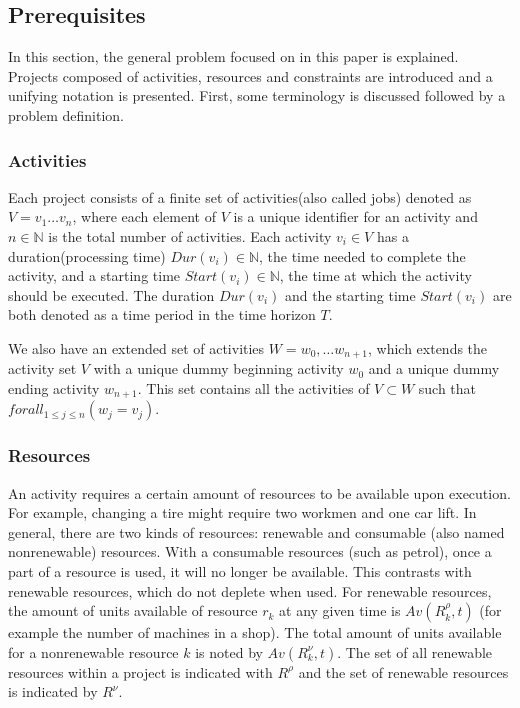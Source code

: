\documentclass{article}
\newcommand{\renres}[0]{R^\rho} %
\newcommand{\conres}[0]{R^\nu} %
\newcommand{\av}[1]{\textit{Av}(#1)} %
\newcommand{\dur}[1]{\textit{Dur}(#1)} %
\newcommand{\start}[1]{\textit{Start}(#1)} %
\begin{document}
\subsection{Prerequisites}
In this section, the general problem focused on in this paper is explained.
Projects composed of activities, resources and constraints are introduced and a unifying notation is presented.
First, some terminology is discussed followed by a problem definition.

\subsubsection{Activities}
Each project consists of a finite set of activities(also called jobs) denoted as $V = v_1 \ldots v_n$, where each element of $V$ is a unique identifier for an activity and $n \in \mathbb{N}$ is the total number of activities.
Each activity $v_i \in V$ has a duration(processing time) $\dur{v_i} \in \mathbb{N}$, the time needed to complete the activity, and a starting time $\start{v_i} \in \mathbb{N}$, the time at which the activity should be executed. The duration $\dur{v_i}$ and the starting time $\start{v_i}$ are both denoted as a time period in the time horizon $T$.

We also have an extended set of activities $W = w_0, \ldots w_{n+1}$, which extends the activity set $V$ with a unique dummy beginning activity $w_0$ and a unique dummy ending activity $w_{n+1}$. This set contains all the activities of $V \subset W$ such that $forall_{1 \leq j \leq n}(w_j = v_j)$.

\subsubsection{Resources}
An activity requires a certain amount of resources to be available upon execution.
For example, changing a tire might require two workmen and one car lift.
In general, there are two kinds of resources: renewable and consumable (also named nonrenewable) resources.
With a consumable resources (such as petrol), once a part of a resource is used, it will no longer be available.
This contrasts with renewable resources, which do not deplete when used.
For renewable resources, the amount of units available of resource $r_k$ at any given time is $\av{\renres_k, t}$ (for example the number of machines in a shop).
The total amount of units available for a nonrenewable resource $k$ is noted by $\av{\conres_k, t}$.
The set of all renewable resources within a project is indicated with $\renres$ and the set of renewable resources is indicated by $\conres$. 
\end{document}
